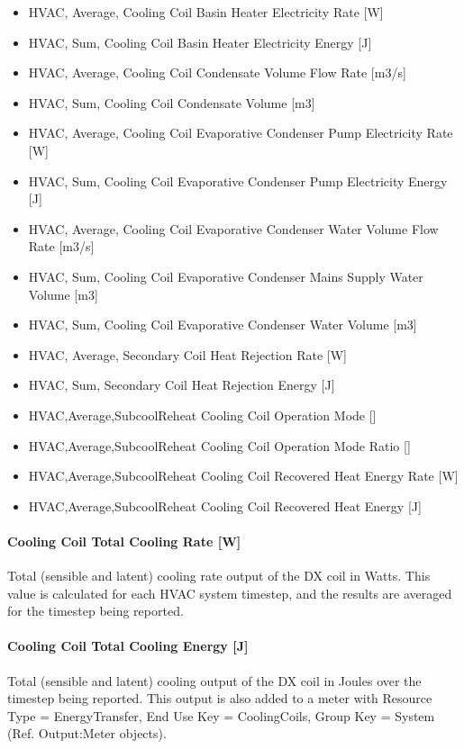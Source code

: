 \begin{itemize}
\item HVAC, Average, Cooling Coil Basin Heater Electricity Rate {[}W{]}
\item HVAC, Sum, Cooling Coil Basin Heater Electricity Energy {[}J{]}
\item HVAC, Average, Cooling Coil Condensate Volume Flow Rate {[}m3/s{]}
\item HVAC, Sum, Cooling Coil Condensate Volume {[}m3{]}
\item HVAC, Average, Cooling Coil Evaporative Condenser Pump Electricity Rate {[}W{]}
\item HVAC, Sum, Cooling Coil Evaporative Condenser Pump Electricity Energy {[}J{]}
\item HVAC, Average, Cooling Coil Evaporative Condenser Water Volume Flow Rate {[}m3/s{]}
\item HVAC, Sum, Cooling Coil Evaporative Condenser Mains Supply Water Volume {[}m3{]}
\item HVAC, Sum, Cooling Coil Evaporative Condenser Water Volume {[}m3{]}
\item HVAC, Average, Secondary Coil Heat Rejection Rate {[}W{]}
\item HVAC, Sum, Secondary Coil Heat Rejection Energy {[}J{]}
\item
  HVAC,Average,SubcoolReheat Cooling Coil Operation Mode {[]}
\item
  HVAC,Average,SubcoolReheat Cooling Coil Operation Mode Ratio {[]}
\item
  HVAC,Average,SubcoolReheat Cooling Coil Recovered Heat Energy Rate {[}W{]}
\item
  HVAC,Average,SubcoolReheat Cooling Coil Recovered Heat Energy {[}J{]}
\end{itemize}

\paragraph{Cooling Coil Total Cooling Rate {[}W{]}}

Total (sensible and latent) cooling rate output of the DX coil in Watts. This value is calculated for each HVAC system timestep, and the results are averaged for the timestep being reported.

\paragraph{Cooling Coil Total Cooling Energy {[}J{]}}

Total (sensible and latent) cooling output of the DX coil in Joules over the timestep being reported. This output is also added to a meter with Resource Type = EnergyTransfer, End Use Key = CoolingCoils, Group Key = System (Ref. Output:Meter objects).


